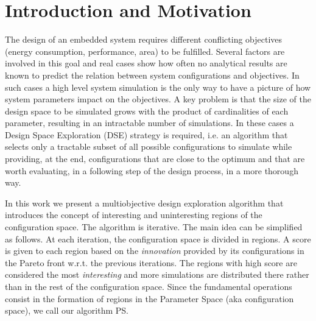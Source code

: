 
\section{Introduction and Motivation}

The design of an embedded system requires different conflicting
objectives (energy consumption, performance, area) to be fulfilled.
Several factors are involved in this goal and real cases show how
often no analytical results are known to predict the relation between
system configurations and objectives. In such cases a high level
system simulation is the only way to have a picture of how system
parameters impact on the objectives.  A key problem is that the size
of the design space to be simulated grows with the product of
cardinalities of each parameter, resulting in an intractable number
of simulations. In these cases a Design Space
Exploration (DSE) strategy is required, i.e. an algorithm that selects
only a tractable subset of all possible configurations to simulate while providing, at the end, configurations that are close to the optimum and that are worth evaluating, in a following step of the design process, in a more thorough way.


In this work we present a multiobjective design exploration algorithm
that introduces the concept of interesting and uninteresting regions of the configuration space.
The algorithm is iterative. The main idea can be simplified as follows. At each iteration, the configuration space is divided in regions. A score is given to each region based on the \emph{innovation} provided by its configurations in the Pareto front w.r.t. the previous iterations. The regions with high score are considered the most \emph{interesting} and more simulations are distributed there rather than in the rest of the configuration space. Since the fundamental operations consist in the formation of regions in the Parameter Space (aka configuration space), we call our algorithm PS.

